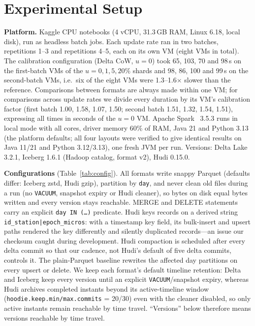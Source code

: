 \documentclass[conference]{IEEEtran}
\begin{document}
\section{Experimental Setup}\label{sec:setup}
\textbf{Platform.} Kaggle CPU notebooks (4 vCPU, 31.3\,GB RAM, Linux 6.18, local disk), run as headless batch
jobs. Each update rate ran in two batches, repetitions 1--3 and repetitions 4--5, each on its own VM (eight VMs in total). The calibration
configuration (Delta CoW, $u=0$) took 65, 103, 70 and 98\,s on the first-batch VMs of the $u=0,1,5,20\%$ shards and 98, 86, 100 and
99\,s on the second-batch VMs, i.e.\ six of the eight VMs were 1.3--1.6$\times$ slower than the reference.
Comparisons between formats are always made within one VM; for comparisons across update rates we divide every
duration by its VM's calibration factor (first batch 1.00, 1.58, 1.07, 1.50; second batch 1.51, 1.32, 1.54, 1.51), expressing all times in seconds of the
$u=0$ VM. Apache Spark~\cite{zaharia2012rdd,armbrust2015sparksql}
3.5.3 runs in local mode with all cores, driver memory 60\% of RAM, Java 21 and Python 3.13 (the platform defaults; all four layouts were verified to give
identical results on Java 11/21 and Python 3.12/3.13), one fresh JVM per run.
Versions: Delta Lake 3.2.1, Iceberg 1.6.1 (Hadoop catalog, format v2), Hudi 0.15.0.

\textbf{Configurations} (Table~\ref{tab:config}). All formats write snappy Parquet (defaults differ: Iceberg zstd,
Hudi gzip), partition by \texttt{day}, and never clean old files during a run (no \texttt{VACUUM}, snapshot expiry or
Hudi cleaner), so bytes on disk equal bytes written and every version stays reachable. MERGE and DELETE statements
carry an explicit \texttt{day IN (\dots)} predicate. Hudi keys records on a derived string
\texttt{id\_station|epoch\_micros}: with a timestamp key field, its bulk-insert and upsert paths rendered the key
differently and silently duplicated records---an issue our checksum caught during development. Hudi compaction is
scheduled after every delta commit so that our cadence, not Hudi's default of five delta commits, controls it.
The plain-Parquet baseline rewrites the affected day partitions on every upsert or delete.
We keep each format's default timeline retention: Delta and Iceberg keep every version until an explicit
\texttt{VACUUM}/snapshot expiry, whereas Hudi archives completed instants beyond its active-timeline window
(\texttt{hoodie.keep.min/max.commits} = 20/30) even with the cleaner disabled, so only active instants remain
reachable by time travel. ``Versions'' below therefore means versions reachable by time travel.
\end{document}
